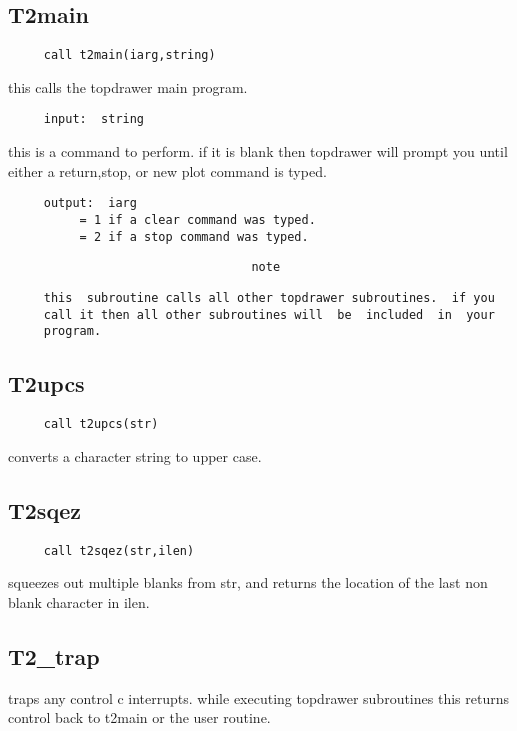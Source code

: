 \subsection{T2main}
\begin{verbatim}
     call t2main(iarg,string) 
\end{verbatim}

this calls the topdrawer main program.  
\begin{verbatim}
     input:  string 
\end{verbatim}
this  is a command to perform.  if it is blank then topdrawer will prompt
you until either a return,stop, or new plot command is typed.  
\begin{verbatim}
     output:  iarg 
          = 1 if a clear command was typed.  
          = 2 if a stop command was typed.  
\end{verbatim}


\begin{verbatim}
                                  note
\end{verbatim}

\begin{verbatim}
     this  subroutine calls all other topdrawer subroutines.  if you
     call it then all other subroutines will  be  included  in  your
     program.  
\end{verbatim}


\subsection{T2upcs}
\begin{verbatim}
     call t2upcs(str) 
\end{verbatim}

converts a character string to upper case.  
\subsection{T2sqez}
\begin{verbatim}
     call t2sqez(str,ilen) 
\end{verbatim}

squeezes  out  multiple  blanks from str, and returns the location of the
last non blank character in ilen.  
\subsection{T2\_trap}

traps  any  control  c interrupts.  while executing topdrawer subroutines
this returns control back to t2main or the user routine.  
